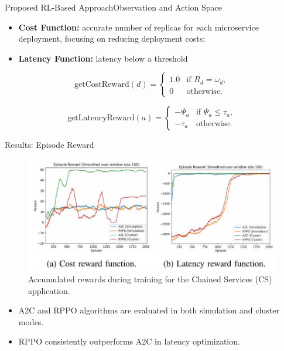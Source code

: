 \documentclass{beamer}
\begin{document}
\begin{frame}{Proposed RL-Based Approach}{Observation and Action Space}

    \begin{itemize}
        \item \textbf{Cost Function:} accurate number of replicas for each microservice deployment, focusing on reducing deployment costs;
        \item \textbf{Latency Function:} latency below a threshold
    \end{itemize}

    \begin{equation}
        \text{getCostReward}(d) =
        \begin{cases} 
            1.0 & \text{if } R_d = \omega_d, \\
            0 & \text{otherwise.}
        \end{cases}
        \label{eq:cost-reward}
    \end{equation}
    
    \begin{equation}
        \text{getLatencyReward}(a) =
        \begin{cases}
            -\Psi_a & \text{if } \Psi_a \leq \tau_a, \\
            -\tau_a & \text{otherwise.}
        \end{cases}
        \label{eq:latency-reward}
    \end{equation}

\end{frame}

\begin{frame}{Results: Episode Reward}

    \begin{figure}
        \includegraphics[width=\textwidth]{images/2024_11_17_21ad14b6196e5740bf69g-7.jpg} %
        \caption*{Accumulated rewards during training for the Chained Services (CS) application.}
    \end{figure}
    \begin{itemize}
        \item A2C and RPPO algorithms are evaluated in both simulation and cluster modes.
        \item RPPO consistently outperforms A2C in latency optimization.
    \end{itemize}
\end{frame}
\end{document}
